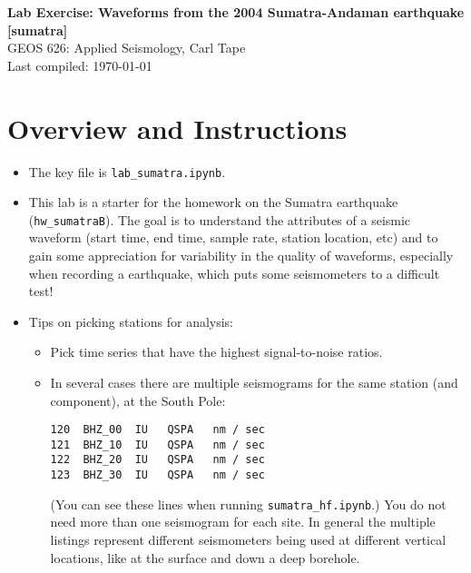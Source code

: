 \documentclass[11pt,titlepage,fleqn]{article}
\newcommand{\tfile}{{\tt lab\_sumatra.ipynb}}
\begin{document}

\begin{spacing}{1.2} 
\centering
{\large \bf Lab Exercise: Waveforms from the 2004 Sumatra-Andaman earthquake [sumatra]} \\
GEOS 626: Applied Seismology, Carl Tape \\
Last compiled: \today
\end{spacing}

\section{Overview and Instructions}

\begin{itemize}
\item The key file is \tfile.


\item This lab is a starter for the homework on the Sumatra earthquake (\verb+hw_sumatraB+). The goal is to understand the attributes of a seismic waveform (start time, end time, sample rate, station location, etc) and to gain some appreciation for variability in the quality of waveforms, especially when recording a  earthquake, which puts some seismometers to a difficult test!


\item Tips on picking stations for analysis:
\begin{itemize}
\item Pick time series that have the highest signal-to-noise ratios.
\item In several cases there are multiple seismograms for the same station (and component), \eg at the South Pole:
%
\begin{spacing}{1.0}
\begin{verbatim}
120  BHZ_00  IU   QSPA   nm / sec
121  BHZ_10  IU   QSPA   nm / sec
122  BHZ_20  IU   QSPA   nm / sec
123  BHZ_30  IU   QSPA   nm / sec
\end{verbatim}
\end{spacing}
%
(You can see these lines when running \verb+sumatra_hf.ipynb+.)
You do not need more than one seismogram for each site. In general the multiple listings represent different seismometers being used at different vertical locations, like at the surface and down a deep borehole.


\end{itemize}
\end{itemize}
\end{document}
